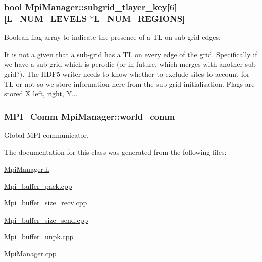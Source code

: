 \subsubsection[{\texorpdfstring{subgrid\+\_\+tlayer\+\_\+key}{subgrid_tlayer_key}}]{\setlength{\rightskip}{0pt plus 5cm}bool Mpi\+Manager\+::subgrid\+\_\+tlayer\+\_\+key\mbox{[}6\mbox{]}\mbox{[}{\bf L\+\_\+\+N\+U\+M\+\_\+\+L\+E\+V\+E\+LS} $\ast${\bf L\+\_\+\+N\+U\+M\+\_\+\+R\+E\+G\+I\+O\+NS}\mbox{]}}\hypertarget{class_mpi_manager_a18d53c4f9968cccec36127d33776e3d4}{}\label{class_mpi_manager_a18d53c4f9968cccec36127d33776e3d4}


Boolean flag array to indicate the presence of a TL on sub-\/grid edges. 

It is not a given that a sub-\/grid has a TL on every edge of the grid. Specifically if we have a sub-\/grid which is perodic (or in future, which merges with another sub-\/grid?). The H\+D\+F5 writer needs to know whether to exclude sites to account for TL or not so we store information here from the sub-\/grid initialisation. Flags are stored X left, right, Y... 
\subsubsection[{\texorpdfstring{world\+\_\+comm}{world_comm}}]{\setlength{\rightskip}{0pt plus 5cm}M\+P\+I\+\_\+\+Comm Mpi\+Manager\+::world\+\_\+comm}\hypertarget{class_mpi_manager_aec1ed834d1a8fa19f87499fb0d5cd332}{}\label{class_mpi_manager_aec1ed834d1a8fa19f87499fb0d5cd332}


Global M\+PI communicator. 



The documentation for this class was generated from the following files\+:\begin{DoxyCompactItemize}
\item 
\hyperlink{_mpi_manager_8h}{Mpi\+Manager.\+h}\item 
\hyperlink{_mpi__buffer__pack_8cpp}{Mpi\+\_\+buffer\+\_\+pack.\+cpp}\item 
\hyperlink{_mpi__buffer__size__recv_8cpp}{Mpi\+\_\+buffer\+\_\+size\+\_\+recv.\+cpp}\item 
\hyperlink{_mpi__buffer__size__send_8cpp}{Mpi\+\_\+buffer\+\_\+size\+\_\+send.\+cpp}\item 
\hyperlink{_mpi__buffer__unpk_8cpp}{Mpi\+\_\+buffer\+\_\+unpk.\+cpp}\item 
\hyperlink{_mpi_manager_8cpp}{Mpi\+Manager.\+cpp}\end{DoxyCompactItemize}

